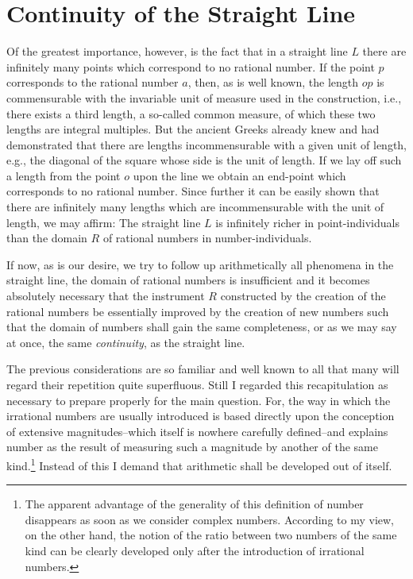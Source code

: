 \documentclass[oneside,12pt]{book}
\begin{document}
\section{Continuity of the Straight Line}
Of the greatest importance, however, is the fact that in a straight line $L$ there are infinitely many points which correspond to no rational number. If the point $p$ corresponds to the rational number $a$, then, as is well known, the length $op$ is commensurable with the invariable unit of measure used in the construction, i.e., there exists a third length, a so-called common measure, of which these two lengths are integral multiples. But the ancient Greeks already knew and had demonstrated that there are lengths incommensurable with a given unit of length, e.g., the diagonal of the square whose side is the unit of length. If we lay off such a length from the point $o$ upon the line we obtain an end-point which corresponds to no rational number. Since further it can be easily shown that there are infinitely many lengths which are incommensurable with the unit of length, we may affirm: The straight line $L$ is infinitely richer in point-individuals than the domain $R$ of rational numbers in number-individuals.\par 

If now, as is our desire, we try to follow up arithmetically all phenomena in the straight line, the domain of rational numbers is insufficient and it becomes absolutely necessary that the instrument $R$ constructed by the creation of the rational numbers be essentially improved by the creation of new numbers such that the domain of numbers shall gain the same completeness, or as we may say at once, the same \textit{continuity}, as the straight line. \par 

The previous considerations are so familiar and well known to all that many will regard their repetition quite superfluous. Still I regarded this recapitulation as necessary to prepare properly for the main question. For, the way in which the irrational numbers are usually introduced is based directly upon the conception of extensive magnitudes--which itself is nowhere carefully defined--and explains number as the result of measuring such a magnitude by another of the same kind.\footnote{The apparent advantage of the generality of this definition of number disappears as soon as we consider complex numbers. According to my view, on the other hand, the notion of the ratio between two numbers of the same kind can be clearly developed only after the introduction of irrational numbers.} Instead of this I demand that arithmetic shall be developed out of itself. \par 
\end{document}
